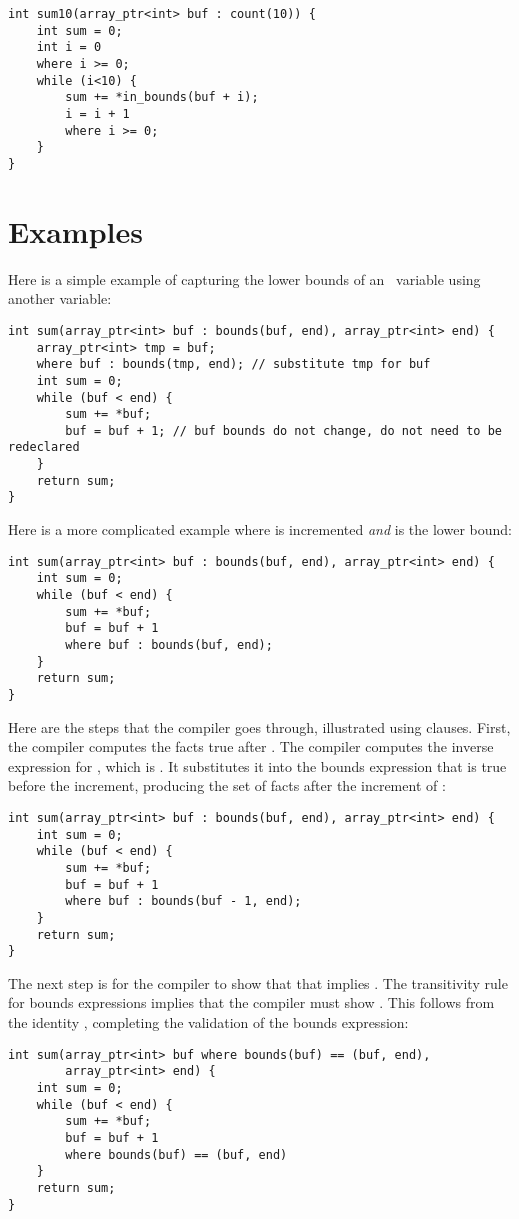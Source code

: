 \begin{lstlisting}
int sum10(array_ptr<int> buf : count(10)) {
    int sum = 0;
    int i = 0
    where i >= 0;
    while (i<10) {
        sum += *in_bounds(buf + i);
        i = i + 1
        where i >= 0;
    }
}
\end{lstlisting}

\section{Examples}

Here is a simple example of capturing the lower bounds of an
\arrayptr\ variable using another variable:

\begin{lstlisting}
int sum(array_ptr<int> buf : bounds(buf, end), array_ptr<int> end) {
    array_ptr<int> tmp = buf;
    where buf : bounds(tmp, end); // substitute tmp for buf
    int sum = 0;
    while (buf < end) {
        sum += *buf;   
        buf = buf + 1; // buf bounds do not change, do not need to be redeclared
    }
    return sum;
}
\end{lstlisting}

Here is a more complicated example where  is incremented
\emph{and}  is the lower bound:

\begin{lstlisting}
int sum(array_ptr<int> buf : bounds(buf, end), array_ptr<int> end) {
    int sum = 0;
    while (buf < end) {
        sum += *buf;   
        buf = buf + 1
        where buf : bounds(buf, end);
    }
    return sum;
}
\end{lstlisting}

Here are the steps that the compiler goes through, illustrated using 
 clauses. First, the compiler computes the facts true after
. The compiler computes the inverse expression for
, which is . It substitutes it into the
bounds expression that is true before the increment, producing the set
of facts after the increment of 
:

\begin{lstlisting}
int sum(array_ptr<int> buf : bounds(buf, end), array_ptr<int> end) {
    int sum = 0;
    while (buf < end) {
        sum += *buf;   
        buf = buf + 1
        where buf : bounds(buf - 1, end); 
    }
    return sum;
}
\end{lstlisting}

The next step is for the compiler to show that that  implies . The
transitivity rule for bounds expressions implies that the compiler must
show . This follows from the
identity  \code{-}  \code{<} ,
completing the validation of the bounds expression:

\begin{lstlisting}
int sum(array_ptr<int> buf where bounds(buf) == (buf, end), 
        array_ptr<int> end) {
    int sum = 0;
    while (buf < end) {
        sum += *buf;   
        buf = buf + 1
        where bounds(buf) == (buf, end) 
    }
    return sum;
}
\end{lstlisting}
